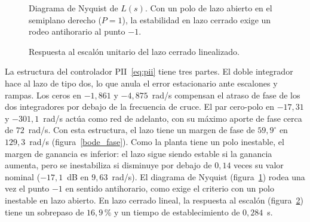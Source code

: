 \begin{figure}[ht]
    \centering
    
    \caption[Diagrama de Nyquist]{Diagrama de Nyquist de $L(s)$. Con un polo de lazo abierto en el semiplano derecho ($P=1$), la estabilidad en lazo cerrado exige un rodeo antihorario al punto $-1$.}
    \label{nyquist}
\end{figure}

\begin{figure}[ht]
    \centering
    
    \caption[Respuesta al escalón]{Respuesta al escalón unitario del lazo cerrado linealizado.}
    \label{step_response}
\end{figure}

La estructura del controlador PII~\eqref{eq:pii} tiene tres partes. El doble integrador hace al lazo de tipo dos, lo que anula el error estacionario ante escalones y rampas. Los ceros en $-1{,}861$ y $-4{,}875$~rad/s compensan el atraso de fase de los dos integradores por debajo de la frecuencia de cruce. El par cero-polo en $-17{,}31$ y $-301{,}1$~rad/s actúa como red de adelanto, con su máximo aporte de fase cerca de $72$~rad/s. Con esta estructura, el lazo tiene un margen de fase de $59{,}9^\circ$ en $129{,}3$~rad/s (figura~\ref{bode_fase}). Como la planta tiene un polo inestable, el margen de ganancia es inferior: el lazo sigue siendo estable si la ganancia aumenta, pero se inestabiliza si disminuye por debajo de $0{,}14$ veces su valor nominal ($-17{,}1$~dB en $9{,}63$~rad/s). El diagrama de Nyquist (figura~\ref{nyquist}) rodea una vez el punto $-1$ en sentido antihorario, como exige el criterio con un polo inestable en lazo abierto. En lazo cerrado lineal, la respuesta al escalón (figura~\ref{step_response}) tiene un sobrepaso de $16{,}9$\,\% y un tiempo de establecimiento de $0{,}284$~s.    

\FloatBarrier
\newpage


